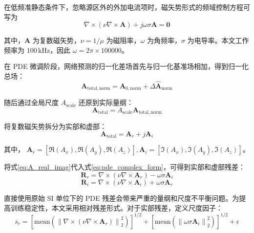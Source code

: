 在低频准静态条件下，忽略源区外的外加电流项时，磁矢势形式的频域控制方程可写为
\begin{equation}
\label{eq:pde_complex_form}
\nabla\times
\left(
\nu \nabla\times \mathbf A
\right)
+
j\omega\sigma \mathbf A
=
\mathbf 0
\end{equation}

其中，$\mathbf A$ 为复数磁矢势，$\nu=1/\mu$ 为磁阻率，$\omega$ 为角频率，$\sigma$ 为电导率。本文工作频率为 $100\,\mathrm{kHz}$，因此
$
\omega=2\pi\times 100000
$。

在 PDE 微调阶段，网络预测的归一化差场首先与归一化基准场相加，得到归一化总场：
\begin{equation}
\label{eq:A_total_norm_pde}
\mathbf A_{\mathrm{total,norm}}
=
\mathbf A_{0,\mathrm{norm}}
+
\Delta \hat{\mathbf A}_{\mathrm{norm}}
\end{equation}

随后通过全局尺度 $A_{\mathrm{scale}}$ 还原到实际量纲：
\begin{equation}
\label{eq:A_total_real}
\mathbf A_{\mathrm{total}}
=
A_{\mathrm{scale}}
\mathbf A_{\mathrm{total,norm}}
\end{equation}

将复数磁矢势拆分为实部和虚部：
\begin{equation}
\label{eq:A_real_imag}
\mathbf A_{\mathrm{total}}
=
\mathbf A_r
+
j\mathbf A_i
\end{equation}

其中，
$
\mathbf A_r=[\Re(A_x),\Re(A_y),\Re(A_z)], 
\mathbf A_i=[\Im(A_x),\Im(A_y),\Im(A_z)]
$。

将式\eqref{eq:A_real_imag}代入式\eqref{eq:pde_complex_form}，可得到实部和虚部残差：
\begin{equation}
\label{eq:pde_residual_real}
\mathbf R_r
=
\nabla\times
\left(
\nu\nabla\times \mathbf A_r
\right)
-
\omega\sigma \mathbf A_i
\end{equation}
\begin{equation}
\label{eq:pde_residual_imag}
\mathbf R_i
=
\nabla\times
\left(
\nu\nabla\times \mathbf A_i
\right)
+
\omega\sigma \mathbf A_r
\end{equation}

直接使用原始 SI 单位下的 PDE 残差会带来严重的量纲和尺度不平衡问题。为提高训练稳定性，本文采用相对残差形式。对于实部残差，定义尺度因子：
\begin{equation}
\label{eq:scale_real}
s_r
=
\left[
\mathrm{mean}
\left(
\left\|
\nabla\times
\left(
\nu\nabla\times \mathbf A_r
\right)
\right\|_2^2
\right)
\right]^{1/2}
+
\left[
\mathrm{mean}
\left(
\left\|
\omega\sigma \mathbf A_i
\right\|_2^2
\right)
\right]^{1/2}
+
\epsilon
\end{equation}

